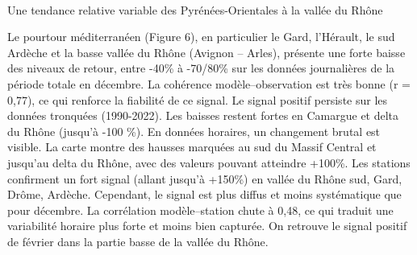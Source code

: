 \documentclass[
  article,
  nofooter,
  noheadings]{jss}
\makeatletter
\let\oldparagraph\paragraph
\renewcommand{\paragraph}{
    \@ifstar
      \xxxParagraphStar
      \xxxParagraphNoStar
  }
\newcommand{\xxxParagraphStar}[1]{\oldparagraph*{#1}\mbox{}}
\newcommand{\xxxParagraphNoStar}[1]{\oldparagraph{#1}\mbox{}}
\makeatother
\begin{document}
\paragraph{Une tendance relative variable des Pyrénées-Orientales à la
vallée du
Rhône}\label{une-tendance-relative-variable-des-pyruxe9nuxe9es-orientales-uxe0-la-valluxe9e-du-rhuxf4ne}

Le pourtour méditerranéen (Figure 6), en particulier le Gard, l'Hérault,
le sud Ardèche et la basse vallée du Rhône (Avignon -- Arles), présente
une forte baisse des niveaux de retour, entre -40\% à -70/80\% sur les
données journalières de la période totale en décembre. La cohérence
modèle--observation est très bonne (r = 0,77), ce qui renforce la
fiabilité de ce signal. Le signal positif persiste sur les données
tronquées (1990-2022). Les baisses restent fortes en Camargue et delta
du Rhône (jusqu'à -100 \%). En données horaires, un changement brutal
est visible. La carte montre des hausses marquées au sud du Massif
Central et jusqu'au delta du Rhône, avec des valeurs pouvant atteindre
+100\%. Les stations confirment un fort signal (allant jusqu'à +150\%)
en vallée du Rhône sud, Gard, Drôme, Ardèche. Cependant, le signal est
plus diffus et moins systématique que pour décembre. La corrélation
modèle--station chute à 0,48, ce qui traduit une variabilité horaire
plus forte et moins bien capturée. On retrouve le signal positif de
février dans la partie basse de la vallée du Rhône.
\end{document}
